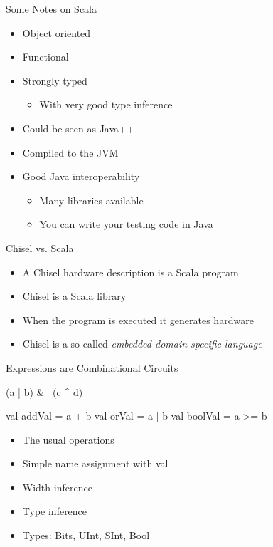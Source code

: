 \documentclass[xcolor=pdflatex,dvipsnames,table]{beamer}
\begin{document}
\begin{frame}[fragile]{Some Notes on Scala}
\begin{itemize}
\item Object oriented
\item Functional
\item Strongly typed
\begin{itemize}
\item With very good type inference
\end{itemize}
\item Could be seen as Java++
\item Compiled to the JVM
\item Good Java interoperability
\begin{itemize}
\item Many libraries available
\item You can write your testing code in Java
\end{itemize}
\end{itemize}
\end{frame}

\begin{frame}[fragile]{Chisel vs. Scala}
\begin{itemize}
\item A Chisel hardware description is a Scala program
\item Chisel is a Scala library
\item When the program is executed it generates hardware
\item Chisel is a so-called \emph{embedded domain-specific language}
\end{itemize}
\end{frame}


\begin{frame}[fragile]{Expressions are Combinational Circuits}
\begin{chisel}
(a | b) & ~(c ^ d)

val addVal = a + b
val orVal = a | b
val boolVal = a >= b
\end{chisel}
\begin{itemize}
\item The usual operations 
\item Simple name assignment with val
\item Width inference
\item Type inference
\item Types: Bits, UInt, SInt, Bool
\end{itemize}
\end{frame}
\end{document}
